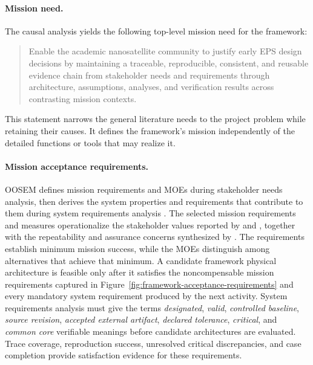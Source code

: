 \documentclass[11pt,a4paper]{article}
\begin{document}
\paragraph{Mission need.}
The causal analysis yields the following top-level mission need for the framework:

\begin{quote}
Enable the academic nanosatellite community to justify early EPS design decisions by maintaining a traceable, reproducible, consistent, and reusable evidence chain from stakeholder needs and requirements through architecture, assumptions, analyses, and verification results across contrasting mission contexts.
\end{quote}

This statement narrows the general literature needs to the project problem while retaining their causes. It defines the framework's mission independently of the detailed functions or tools that may realize it.

\paragraph{Mission acceptance requirements.}
OOSEM defines mission requirements and MOEs during stakeholder needs analysis, then derives the system properties and requirements that contribute to them during system requirements analysis \citep[Secs.~17.3.2--17.3.3]{friedenthal2014practical}. %
The selected mission requirements and measures operationalize the stakeholder values reported by \citet{buruso2026modelbased} and \citet{vizitiu2025optimizing}, together with the repeatability and assurance concerns synthesized by \citet{rostamnia2026digitaltwin}. The requirements establish minimum mission success, while the MOEs distinguish among alternatives that achieve that minimum. A candidate framework physical architecture is feasible only after it satisfies the noncompensable mission requirements captured in Figure~\ref{fig:framework-acceptance-requirements} and every mandatory system requirement produced by the next activity. System requirements analysis must give the terms \emph{designated}, \emph{valid}, \emph{controlled baseline}, \emph{source revision}, \emph{accepted external artifact}, \emph{declared tolerance}, \emph{critical}, and \emph{common core} verifiable meanings before candidate architectures are evaluated. Trace coverage, reproduction success, unresolved critical discrepancies, and case completion provide satisfaction evidence for these requirements.
\end{document}
